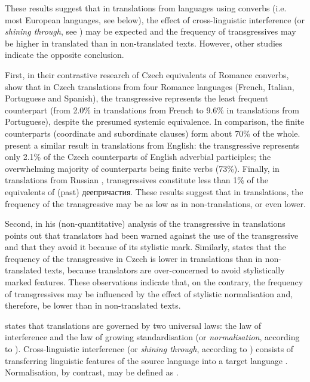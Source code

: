 \documentclass[output=paper,russian]{langsci/langscibook}
\begin{document}
These results suggest that in translations from languages using converbs (i.e. most European languages, see below), the effect of cross-linguistic interference (or \textit{shining through}, see ) may be expected and the frequency of transgressives may be higher in translated than in non-translated texts. However, other studies indicate the opposite conclusion.

First, in their contrastive research of Czech equivalents of Romance converbs, \textcites{cernad15}{ceretal20} show that in Czech translations from four Romance languages (French, Italian, Portuguese and Spanish), the transgressive represents the least frequent counterpart (from 2.0\% in translations from French to 9.6\% in translations from Portuguese), despite the presumed systemic equivalence. In comparison, the finite counterparts (coordinate and subordinate clauses) form about 70\% of the whole. \textcite[240]{malsal15} present a similar result in translations from English: the transgressive represents only 2.1\% of the Czech counterparts of English adverbial participles; the overwhelming majority of counterparts being finite verbs (73\%). Finally, in translations from Russian \parencite{kockova11}, transgressives constitute less than 1\% of the equivalents of (past) деепричастия. These results suggest that in translations, the frequency of the transgressive may be as low as in non-translations, or even lower.

Second, \textcite[26]{becka77} in his (non-quantitative) analysis of the transgressive in translations points out that translators had been warned against the use of the transgressive and that they avoid it because of its stylistic mark. Similarly, \textcite[51]{levy11} states that the frequency of the transgressive in Czech is lower in translations than in non-translated texts, because translators are over-concerned to avoid stylistically marked features. These observations indicate that, on the contrary, the frequency of transgressives may be influenced by the effect of stylistic normalisation and, therefore, be lower than in non-translated texts.

\textcite{toury95} states that translations are governed by two universal laws: the law of interference and the law of growing standardisation (or \textit{normalisation}, according to \textcites{baker93}{baker96}). Cross-linguistic interference (or \textit{shining through}, according to \textcite{teich03}) consists of transferring linguistic features of the source language into a target language \parencite[see][274--279]{toury95}. Normalisation, by contrast, may be defined as .
\end{document}
